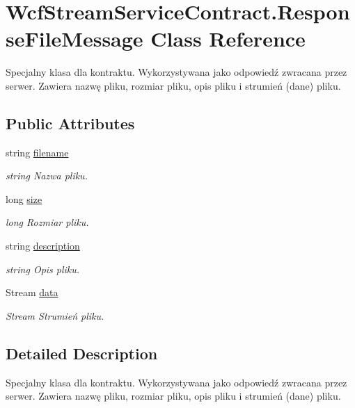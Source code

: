 \hypertarget{class_wcf_stream_service_contract_1_1_response_file_message}{}\section{Wcf\+Stream\+Service\+Contract.\+Response\+File\+Message Class Reference}
\label{class_wcf_stream_service_contract_1_1_response_file_message}


Specjalny klasa dla kontraktu. Wykorzystywana jako odpowiedź zwracana przez serwer. Zawiera nazwę pliku, rozmiar pliku, opis pliku i strumień (dane) pliku.  


\subsection*{Public Attributes}
\begin{DoxyCompactItemize}
\item 
string \hyperlink{class_wcf_stream_service_contract_1_1_response_file_message_a5ff8c19aac4d80019e8704be013f419f}{filename}
\begin{DoxyCompactList}\small\item\em string Nazwa pliku. \end{DoxyCompactList}\item 
long \hyperlink{class_wcf_stream_service_contract_1_1_response_file_message_a0092bddf2bf3874bb0e4293893543e8f}{size}
\begin{DoxyCompactList}\small\item\em long Rozmiar pliku. \end{DoxyCompactList}\item 
string \hyperlink{class_wcf_stream_service_contract_1_1_response_file_message_acded2a786ad0059c9eb5702a3f25065c}{description}
\begin{DoxyCompactList}\small\item\em string Opis pliku. \end{DoxyCompactList}\item 
Stream \hyperlink{class_wcf_stream_service_contract_1_1_response_file_message_aad66c124c1f5ad1c9150f6defb4f8f09}{data}
\begin{DoxyCompactList}\small\item\em Stream Strumień pliku. \end{DoxyCompactList}\end{DoxyCompactItemize}


\subsection{Detailed Description}
Specjalny klasa dla kontraktu. Wykorzystywana jako odpowiedź zwracana przez serwer. Zawiera nazwę pliku, rozmiar pliku, opis pliku i strumień (dane) pliku. 



